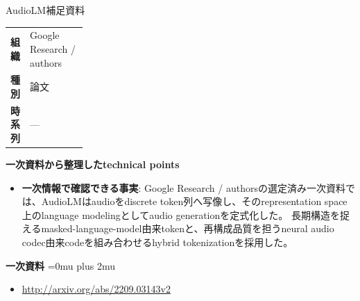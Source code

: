 \begin{technicalnote}{AudioLM}{補足資料}
\begingroup
\begin{tabularx}{\linewidth}{@{}>{\bfseries}p{0.22\linewidth}X@{}}
組織 & Google Research / authors \\
種別 & 論文 \\
時系列 & — \\
\end{tabularx}
\smallskip
{\bfseries 一次資料から整理したtechnical points}
\begin{itemize}[leftmargin=1.5em,itemsep=0.35em]
\item \textbf{一次情報で確認できる事実}: Google Research / authorsの選定済み一次資料では、AudioLMはaudioをdiscrete token列へ写像し、そのrepresentation space上のlanguage modelingとしてaudio generationを定式化した。 長期構造を捉えるmasked-language-model由来tokenと、再構成品質を担うneural audio codec由来codeを組み合わせるhybrid tokenizationを採用した。
\end{itemize}
\begin{minipage}{\linewidth}
\begin{samepage}
{\bfseries 一次資料}
\begingroup\sloppy
\Urlmuskip=0mu plus 2mu\relax
\begin{itemize}[leftmargin=1.5em,itemsep=0.25em]
\item {\scriptsize\url{http://arxiv.org/abs/2209.03143v2}}
\end{itemize}
\endgroup
\end{samepage}
\end{minipage}
\endgroup
\end{technicalnote}
\medskip

